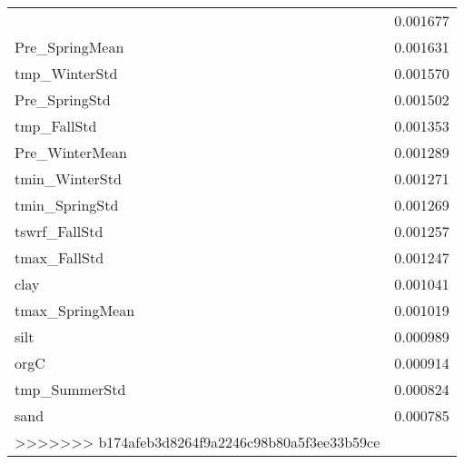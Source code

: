 \begin{tabular}{lr}
\begin{tabular}{rrrrr}
Pre_FallStd & 0.001677 \\
Pre_SpringMean & 0.001631 \\
tmp_WinterStd & 0.001570 \\
Pre_SpringStd & 0.001502 \\
tmp_FallStd & 0.001353 \\
Pre_WinterMean & 0.001289 \\
tmin_WinterStd & 0.001271 \\
tmin_SpringStd & 0.001269 \\
tswrf_FallStd & 0.001257 \\
tmax_FallStd & 0.001247 \\
clay & 0.001041 \\
tmax_SpringMean & 0.001019 \\
silt & 0.000989 \\
orgC & 0.000914 \\
tmp_SummerStd & 0.000824 \\
sand & 0.000785 \\
>>>>>>> b174afeb3d8264f9a2246c98b80a5f3ee33b59ce
\bottomrule
\end{tabular}
